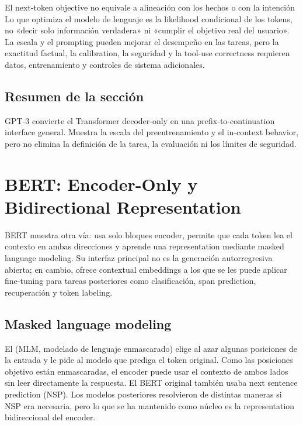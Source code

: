 \documentclass[a4paper]{article}
\begin{document}

\begin{warningbox}{El next-token objective no equivale a alineación con los hechos o con la intención}
Lo que optimiza el modelo de lenguaje es la likelihood condicional de los tokens, no «decir solo información verdadera» ni «cumplir el objetivo real del usuario». La escala y el prompting pueden mejorar el desempeño en las tareas, pero la exactitud factual, la calibration, la seguridad y la tool-use correctness requieren datos, entrenamiento y controles de sistema adicionales.
\end{warningbox}

\subsection{Resumen de la sección}

GPT-3 convierte el Transformer decoder-only en una prefix-to-continuation interface general. Muestra la escala del preentrenamiento y el in-context behavior, pero no elimina la definición de la tarea, la evaluación ni los límites de seguridad.
\section{BERT: Encoder-Only y Bidirectional Representation}

BERT muestra otra vía: usa solo bloques encoder, permite que cada token lea el contexto en ambas direcciones y aprende una representation mediante masked language modeling. Su interfaz principal no es la generación autorregresiva abierta; en cambio, ofrece contextual embeddings a los que se les puede aplicar fine-tuning para tareas posteriores como clasificación, span prediction, recuperación y token labeling.

\subsection{Masked language modeling}

El  (MLM, modelado de lenguaje enmascarado) elige al azar algunas posiciones de la entrada y le pide al modelo que prediga el token original. Como las posiciones objetivo están enmascaradas, el encoder puede usar el contexto de ambos lados sin leer directamente la respuesta. El BERT original también usaba next sentence prediction (NSP). Los modelos posteriores resolvieron de distintas maneras si NSP era necesaria, pero lo que se ha mantenido como núcleo es la representation bidireccional del encoder.
\end{document}
